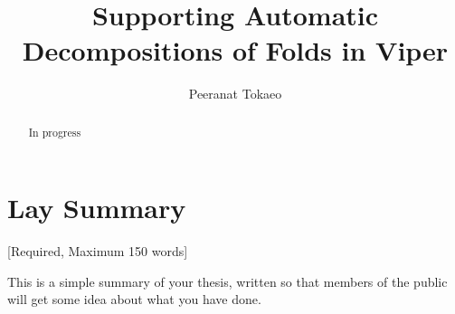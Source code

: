 \documentclass[msc,oneside]{ubcthesis}
\title{Supporting Automatic Decompositions of Folds in Viper}
\author{Peeranat Tokaeo}
\theoremstyle{definition}
\begin{document}
\frontmatter


\maketitle                      %

\clearpage



\clearpage

\begin{abstract}                %
In progress
  
\end{abstract}

\chapter{Lay Summary}

[Required, Maximum 150 words]

This is a simple summary of your thesis, written so that members of the public will get some idea about what you have done. 
\end{document}
